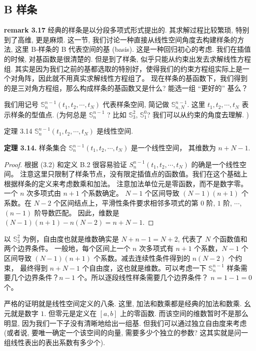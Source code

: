 \documentclass[a4paper]{ctexart}
\begin{document}
{\subsection{B 样条}
{\bf remark 3.17} 经典的样条是以分段多项式形式提出的. 
其求解过程比较繁琐, 特别到了高维, 更是麻烦. 这一节, 
我们讨论一种直接从线性空间角度去构建样条的方法, 
这里 B-样条的 B 代表空间的基 (basis). 这是一种回归初心的考虑. 
我们在插值的时候, 对基函数是很清楚的. 但是到了样条, 似乎只能从约束出发去求解线性方程组. 
其实是因为我们之前的基都选取的特别好，使得我们的约束方程组实际上是一个对角阵，因此就不用真实求解线性方程组了。
现在样条的基函数下，我们得到的是三对角方程组，那么构成样条的基函数又是什么? 能选一组 ``更好的'' 基么？

我们用记号 $\mathbb{S}_{n}^{n - 1}(t_1, t_2, \cdots, t_N)$ 代表样条空间, 
简记做 $\mathbb{S}_{n, N}^{n - 1}$. 这里 $t_1, t_2, \cdots, t_N$ 表示样条的型值点.
(为何总是 $\mathbb{S}_{n}^{n - 1}$ ? 比如 $\mathbb{S}_{3}^{2}$, 
$\mathbb{S}_{1}^{0}$? 我们可以从约束的角度去理解. )



定理 3.14 $\mathbb{S}_{n}^{n - 1}(t_1, t_2, \cdots, t_N)$ 是线性空间.

\noindent \textbf{定理 3.14.} 样条集合 $\mathbb{S}_{n}^{n-1}\left(t_{1}, t_{2},\cdots, t_{N}\right)$ 是一个线性空间，
其维数为 $n + N - 1$.

\begin{proof}
根据 (3.2) 和定义 B.2 很容易验证 $S_{n}^{n - 1}\left(t_{1}, t_{2},\cdots, t_{N}\right)$ 的确是一个线性空间。
注意这里只限制了样条节点，没有限定插值点的函数值。我们在这个基础上根据样条的定义来考虑数乘和加法。
注意加法单位元是零函数，而不是数字零。一个 $n$ 次多项式由 $n+1$ 个系数确定。
$N-1$ 个区间导致 $(N-1)(n+1)$ 个系数。在 $N-2$ 个区间结点上，平滑性条件要求相邻多项式的第 $0$ 阶, $1$ 阶, $\cdots$, $(n - 1)$ 阶导数匹配。
因此，维数是 $(N - 1)(n + 1) - n(N - 2) = n + N - 1$.
\end{proof}

以 $\mathbb{S}_3^2$ 为例，自由度也就是维数确实是 $N + n - 1 = N + 2$, 代表了 $N$ 个函数值和两个边界条件。
一般地，每个区间上一个 $n$ 次多项式有 $n + 1$ 个系数，$N - 1$ 个区间导致 $(N - 1)(n + 1)$ 个系数。减去连续性条件得到的 $n(N - 2)$ 个约束，
最终得到 $n + N - 1$ 个自由度，这也就是维数。可以考虑一下 $\mathbb{S}_{n}^{n - 1}$ 样条需要几个边界条件？$n - 1$ 个。所以逐段线性样条需要几个边界条件？
$n = 1 - 1 = 0$ 个。

严格的证明就是线性空间定义的八条. 这里, 加法和数乘都是经典的加法和数乘.
幺元就是数字 $1$. 但零元是定义在 $[a, b]$ 上的零函数. 
而该空间的维数暂时不是那么明显, 因为我们一下子没有清晰地给出一组基. 
但我们可以通过独立自由度来考虑(或者说, 要唯一确定一个该空间的向量, 
需要多少个独立的参数? 这其实就是问一组线性表出的表出系数有多少个). 

}
\end{document}
